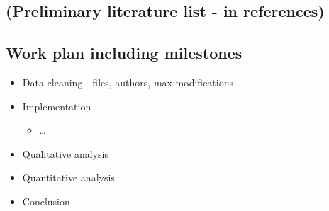 \subsection{(Preliminary literature list - in references)}

\subsection{Work plan including milestones}

\begin{itemize}
    \item Data cleaning - files, authors, max modifications
    \item Implementation
    \begin{itemize}
        \item \dots
    \end{itemize}
    \item Qualitative analysis
    \item Quantitative analysis
    \item Conclusion
\end{itemize}